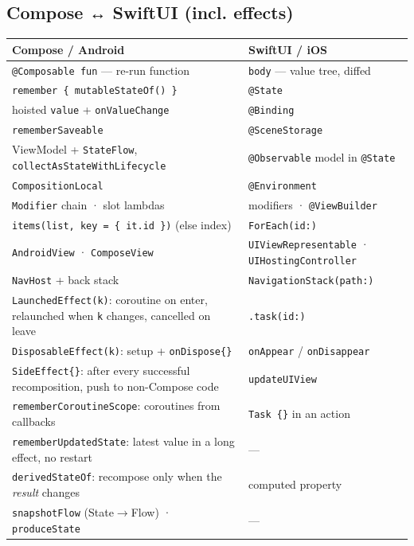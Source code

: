 \documentclass[8pt]{extarticle}
\begin{document}
\begin{multicols}{2}
\section{Compose ↔ SwiftUI (incl. effects)}
{\scriptsize
\noindent\begin{tabularx}{\linewidth}{@{}L>{\raggedright\arraybackslash}p{30mm}@{}}
\toprule
\textbf{Compose / Android} & \textbf{SwiftUI / iOS} \\
\midrule
\texttt{@Composable fun} — re-run function & \texttt{body} — value tree, diffed \\
\texttt{remember \{ mutableStateOf() \}} & \texttt{@State} \\
hoisted \texttt{value} + \texttt{onValueChange} & \texttt{@Binding} \\
\texttt{rememberSaveable} & \texttt{@SceneStorage} \\
ViewModel + \texttt{StateFlow}, \texttt{collectAsStateWithLifecycle} & \texttt{@Observable}
  model in \texttt{@State} \\
\texttt{CompositionLocal} & \texttt{@Environment} \\
\texttt{Modifier} chain · slot lambdas & modifiers · \texttt{@ViewBuilder} \\
\texttt{items(list, key = \{ it.id \})} (else index) & \texttt{ForEach(id:)} \\
\texttt{AndroidView} · \texttt{ComposeView} & \texttt{UIViewRepresentable} ·
  \texttt{UIHostingController} \\
\texttt{NavHost} + back stack & \texttt{NavigationStack(path:)} \\
\midrule
\texttt{LaunchedEffect(k)}: coroutine on enter, relaunched when \texttt{k} changes,
  cancelled on leave & \texttt{.task(id:)} \\
\texttt{DisposableEffect(k)}: setup + \texttt{onDispose\{\}} & \texttt{onAppear} /
  \texttt{onDisappear} \\
\texttt{SideEffect\{\}}: after every successful recomposition, push to non-Compose code &
  \texttt{updateUIView} \\
\texttt{rememberCoroutineScope}: coroutines from callbacks & \texttt{Task \{\}} in an action \\
\texttt{rememberUpdatedState}: latest value in a long effect, no restart & — \\
\texttt{derivedStateOf}: recompose only when the \emph{result} changes & computed property \\
\texttt{snapshotFlow} (State$\to$Flow) · \texttt{produceState} & — \\
\bottomrule
\end{tabularx}}


\end{multicols}
\end{document}
